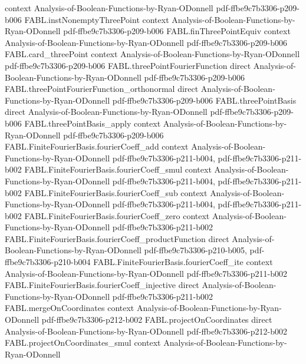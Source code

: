 \begin{theorem}
  {context}
  {Analysis-of-Boolean-Functions-by-Ryan-ODonnell}
  {pdf-ffbe9c7b3306-p209-b006}
\proofstep
  {FABL.instNonemptyThreePoint}
  {context}
  {Analysis-of-Boolean-Functions-by-Ryan-ODonnell}
  {pdf-ffbe9c7b3306-p209-b006}
\proofstep
  {FABL.finThreePointEquiv}
  {context}
  {Analysis-of-Boolean-Functions-by-Ryan-ODonnell}
  {pdf-ffbe9c7b3306-p209-b006}
\proofstep
  {FABL.card_threePoint}
  {context}
  {Analysis-of-Boolean-Functions-by-Ryan-ODonnell}
  {pdf-ffbe9c7b3306-p209-b006}
\proofstep
  {FABL.threePointFourierFunction}
  {direct}
  {Analysis-of-Boolean-Functions-by-Ryan-ODonnell}
  {pdf-ffbe9c7b3306-p209-b006}
\proofstep
  {FABL.threePointFourierFunction_orthonormal}
  {direct}
  {Analysis-of-Boolean-Functions-by-Ryan-ODonnell}
  {pdf-ffbe9c7b3306-p209-b006}
\proofstep
  {FABL.threePointBasis}
  {direct}
  {Analysis-of-Boolean-Functions-by-Ryan-ODonnell}
  {pdf-ffbe9c7b3306-p209-b006}
\proofstep
  {FABL.threePointBasis_apply}
  {context}
  {Analysis-of-Boolean-Functions-by-Ryan-ODonnell}
  {pdf-ffbe9c7b3306-p209-b006}
\proofstep
  {FABL.FiniteFourierBasis.fourierCoeff_add}
  {context}
  {Analysis-of-Boolean-Functions-by-Ryan-ODonnell}
  {pdf-ffbe9c7b3306-p211-b004,
    pdf-ffbe9c7b3306-p211-b002}
\proofstep
  {FABL.FiniteFourierBasis.fourierCoeff_smul}
  {context}
  {Analysis-of-Boolean-Functions-by-Ryan-ODonnell}
  {pdf-ffbe9c7b3306-p211-b004,
    pdf-ffbe9c7b3306-p211-b002}
\proofstep
  {FABL.FiniteFourierBasis.fourierCoeff_sub}
  {context}
  {Analysis-of-Boolean-Functions-by-Ryan-ODonnell}
  {pdf-ffbe9c7b3306-p211-b004,
    pdf-ffbe9c7b3306-p211-b002}
\proofstep
  {FABL.FiniteFourierBasis.fourierCoeff_zero}
  {context}
  {Analysis-of-Boolean-Functions-by-Ryan-ODonnell}
  {pdf-ffbe9c7b3306-p211-b002}
\proofstep
  {FABL.FiniteFourierBasis.fourierCoeff_productFunction}
  {direct}
  {Analysis-of-Boolean-Functions-by-Ryan-ODonnell}
  {pdf-ffbe9c7b3306-p210-b005,
    pdf-ffbe9c7b3306-p210-b004}
\proofstep
  {FABL.FiniteFourierBasis.fourierCoeff_ite}
  {context}
  {Analysis-of-Boolean-Functions-by-Ryan-ODonnell}
  {pdf-ffbe9c7b3306-p211-b002}
\proofstep
  {FABL.FiniteFourierBasis.fourierCoeff_injective}
  {direct}
  {Analysis-of-Boolean-Functions-by-Ryan-ODonnell}
  {pdf-ffbe9c7b3306-p211-b002}
\proofstep
  {FABL.mergeOnCoordinates}
  {context}
  {Analysis-of-Boolean-Functions-by-Ryan-ODonnell}
  {pdf-ffbe9c7b3306-p212-b002}
\proofstep
  {FABL.projectOnCoordinates}
  {direct}
  {Analysis-of-Boolean-Functions-by-Ryan-ODonnell}
  {pdf-ffbe9c7b3306-p212-b002}
\proofstep
  {FABL.projectOnCoordinates_smul}
  {context}
  {Analysis-of-Boolean-Functions-by-Ryan-ODonnell}

\end{theorem}

